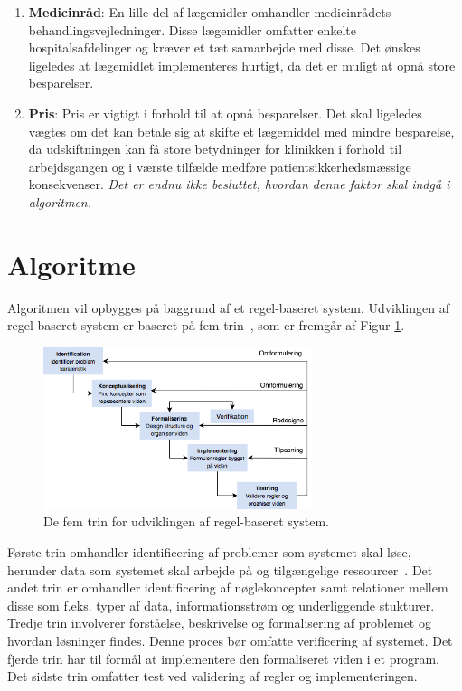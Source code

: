 \begin{enumerate}
 \vspace{2mm}
\item \textbf{Medicinråd}: En lille del af lægemidler omhandler medicinrådets behandlingsvejledninger. Disse lægemidler omfatter enkelte hospitalsafdelinger og kræver et tæt samarbejde med disse. Det ønskes ligeledes at lægemidlet implementeres hurtigt, da det er muligt at opnå store besparelser. \vspace{2mm}
\item \textbf{Pris}: Pris er vigtigt i forhold til at opnå besparelser. Det skal ligeledes vægtes om det kan betale sig at skifte et lægemiddel med mindre besparelse, da udskiftningen kan få store betydninger for klinikken i forhold til arbejdsgangen og i værste tilfælde medføre patientsikkerhedsmæssige konsekvenser. \textit{Det er endnu ikke besluttet, hvordan denne faktor skal indgå i algoritmen.}\vspace{2mm}
\end{enumerate}

\section{Algoritme}
Algoritmen vil opbygges på baggrund af et regel-baseret system. %
Udviklingen af regel-baseret system er baseret på fem trin~\citep{Ligeza2006}, som er fremgår af Figur \ref{fig:metode}.  

\begin{figure}[H]\centering	\includegraphics[width=0.7\textwidth]{Statusseminar/metode.png} 
	\caption{De fem trin for udviklingen af regel-baseret system.~\citep{Ligeza2006}}
	\label{fig:metode}  
\end{figure}
\vspace{-0.5cm}
Første trin omhandler identificering af problemer som systemet skal løse, herunder data som systemet skal arbejde på og tilgængelige ressourcer~\citep{Ligeza2006}. Det andet trin er omhandler identificering af nøglekoncepter samt relationer mellem disse som f.eks. typer af data, informationsstrøm og underliggende stukturer. Tredje trin involverer forståelse, beskrivelse og formalisering af problemet og hvordan løsninger findes. Denne proces bør omfatte verificering af systemet. Det fjerde trin har til formål at implementere den formaliseret viden i et program. Det sidste trin omfatter test ved validering af regler og implementeringen.~\citep{Ligeza2006}
 
